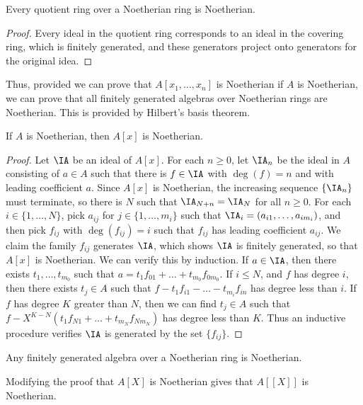 \begin{lemma}
    Every quotient ring over a Noetherian ring is Noetherian.
\end{lemma}
\begin{proof}
    Every ideal in the quotient ring corresponds to an ideal in the covering ring, which is finitely generated, and these generators project onto generators for the original idea.
\end{proof}

Thus, provided we can prove that $A[x_1, \dots, x_n]$ is Noetherian if $A$ is Noetherian, we can prove that all finitely generated algebras over Noetherian rings are Noetherian. This is provided by Hilbert's basis theorem.

\begin{theorem}
    If $A$ is Noetherian, then $A[x]$ is Noetherian.
\end{theorem}
\begin{proof}
    Let $\IA$ be an ideal of $A[x]$. For each $n \geq 0$, let $\IA_n$ be the ideal in $A$ consisting of $a \in A$ such that there is $f \in \IA$ with $\deg(f) = n$ and with leading coefficient $a$. Since $A[x]$ is Noetherian, the increasing sequence $\{ \IA_n \}$ must terminate, so there is $N$ such that $\IA_{N + n} = \IA_N$ for all $n \geq 0$. For each $i \in \{ 1, \dots, N \}$, pick $a_{ij}$ for $j \in \{ 1, \dots, m_i \}$ such that $\IA_i = (a_{i1}, \dots, a_{im_i})$, and then pick $f_{ij}$ with $\deg(f_{ij}) = i$ such that $f_{ij}$ has leading coefficient $a_{ij}$. We claim the family $f_{ij}$ generates $\IA$, which shows $\IA$ is finitely generated, so that $A[x]$ is Noetherian. We can verify this by induction. If $a \in \IA$, then there exists $t_1, \dots, t_{m_0}$ such that $a = t_1 f_{01} + \dots + t_{m_0} f_{0m_0}$. If $i \leq N$, and $f$ has degree $i$, then there exists $t_j \in A$ such that $f - t_1 f_{i1} - \dots - t_{m_i} f_{in}$ has degree less than $i$. If $f$ has degree $K$ greater than $N$, then we can find $t_j \in A$ such that $f - X^{K-N}(t_1 f_{N1} + \dots + t_{m_N} f_{Nm_N})$ has degree less than $K$. Thus an inductive procedure verifies $\IA$ is generated by the set $\{ f_{ij} \}$.
\end{proof}

\begin{corollary}
    Any finitely generated algebra over a Noetherian ring is Noetherian.
\end{corollary}

Modifying the proof that $A[X]$ is Noetherian gives that $A[[X]]$ is Noetherian.

